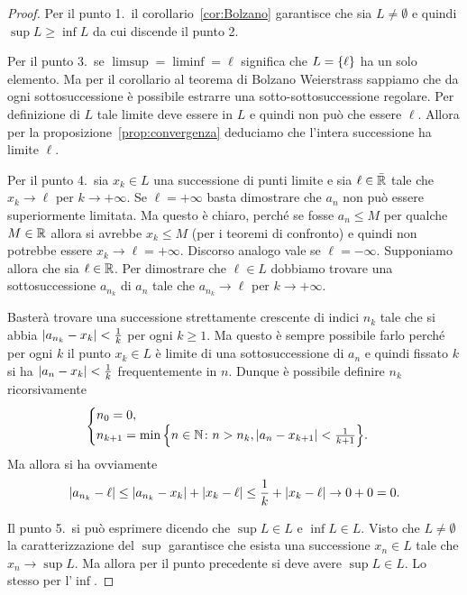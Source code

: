 \begin{proof}
  Per il punto 1.\
  il corollario~\ref{cor:Bolzano} garantisce che sia $L\neq \emptyset$ e
  quindi $\sup L \ge \inf L$ da cui discende il punto 2.

  Per il punto 3.\ se $\limsup = \liminf = \ell$ significa che $L={\left\{ \ell \right\}}$
  ha un solo elemento. Ma per il corollario al teorema di Bolzano Weierstrass
  sappiamo che da ogni sottosuccessione è possibile estrarre una sotto-sottosuccessione
  regolare. Per definizione di $L$ tale limite deve essere in $L$
  e quindi non può che essere $\ell$. Allora per la proposizione~\ref{prop:convergenza}
  deduciamo che l'intera successione ha limite $\ell$.

  Per il punto 4.\ sia $x_k\in L$ una successione di punti limite
  e sia $\ell\in \bar {\mathbb R}$ tale che $x_k \to \ell$ per $k\to +\infty$.
  Se $\ell = +\infty$ basta dimostrare che $a_n$ non può essere superiormente
  limitata. Ma questo è chiaro, perché se fosse $a_n \le M$ per qualche $M\in \mathbb R$
  allora si avrebbe $x_k\le M$ (per i teoremi di confronto) e quindi non potrebbe
  essere $x_k \to \ell=+\infty$. Discorso analogo vale se $\ell = -\infty$.
  Supponiamo allora che sia $\ell \in \mathbb R$.
  Per dimostrare che
  $\ell \in L$ dobbiamo trovare una sottosuccessione $a_{n_k}$ di $a_n$ tale
  che $a_{n_k}\to \ell$ per $k\to +\infty$.

  Basterà trovare una successione strettamente crescente
  di indici $n_k$ tale
  che si abbia ${\left|a_{n_k} - x_k\right|}<\frac 1 {k}$ per ogni
  $k\ge 1$.
  Ma questo è sempre possibile farlo perché per ogni $k$
  il punto $x_k\in L$ è limite di una sottosuccessione di
  $a_n$ e quindi fissato $k$ si ha ${\left|a_n-x_k\right|}<\frac 1 k$
  frequentemente in $n$.
  Dunque è possibile definire $n_k$ ricorsivamente
  \[
   \begin{cases}
    n_0 = 0,\\
    n_{k+1} = \min{\left\{ n\in \mathbb N\colon n>n_k, {\left|a_n-x_{k+1}\right|}<\frac{1}{k+1} \right\}}.
   \end{cases}
  \]
  Ma allora si ha ovviamente
  \[
    {\left|a_{n_k} - \ell\right|}
    \le {\left|a_{n_k} - x_k\right|} + {\left|x_k -\ell\right|}
    \le \frac 1 k + {\left|x_k-\ell\right|} \to 0+0 = 0.
  \]

  Il punto 5.\ si può esprimere dicendo che $\sup L\in L$ e $\inf L \in L$.
  Visto che $L\neq \emptyset$ la caratterizzazione del $\sup$
  garantisce che esista una successione $x_n\in L$ tale che $x_n \to \sup L$.
  Ma allora per il punto precedente si deve avere $\sup L \in L$.
  Lo stesso per l'$\inf$.


\end{proof}
